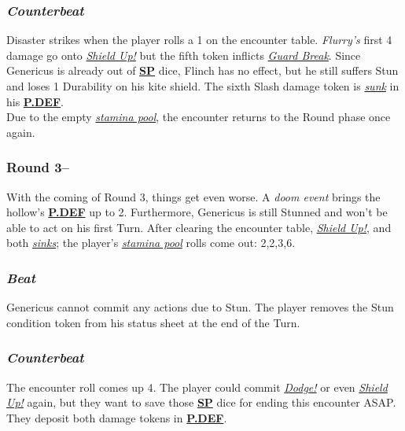 \documentclass[12pt]{article}
\newcommand{\refto}[1]{\hyperlink{#1}{\textbf{#1}}}
\newcommand{\reftoit}[1]{\hyperlink{#1}{\emph{#1}}}
\begin{document}
\begin{multicols*}{2}
\subsubsection*{\emph{Counterbeat}}
Disaster strikes when the player rolls a 1 on the encounter table. \emph{Flurry’s} first 4 damage go onto \reftoit{Shield Up!} but the fifth token inflicts \reftoit{Guard Break}. Since Genericus is already out of \refto{SP} dice, Flinch has no effect, but he still suffers Stun and loses 1 Durability on his kite shield. The sixth Slash damage token is \reftoit{sunk} in his \refto{P.DEF}.\\
Due to the empty \reftoit{stamina pool}, the encounter returns to the Round phase once again.

\subsubsection*{Round 3--}
With the coming of Round 3, things get even worse. A \emph{doom event} brings the hollow’s \refto{P.DEF} up to 2. Furthermore, Genericus is still Stunned and won’t be able to act on his first Turn. After clearing the encounter table, \reftoit{Shield Up!}, and both \reftoit{sinks}; the player’s \reftoit{stamina pool} rolls come out: 2,2,3,6.
\subsubsection*{\emph{Beat}}
Genericus cannot commit any actions due to Stun. The player removes the Stun condition token from his status sheet at the end of the Turn.
\subsubsection*{\emph{Counterbeat}}
The encounter roll comes up 4. The player could commit \reftoit{Dodge!} or even \reftoit{Shield Up!} again, but they want to save those \refto{SP} dice for ending this encounter ASAP. They deposit both damage tokens in \refto{P.DEF}.

\end{multicols*}
\end{document}
